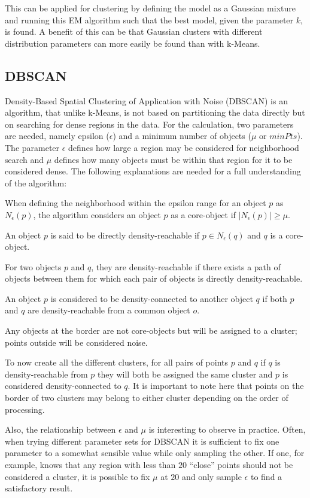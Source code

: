 \documentclass[
	a4paper,
	english,
	twoside,
	openright,               
	11pt                            
	]{report}
\begin{document}
This can be applied for clustering by defining the model as a Gaussian mixture and running this EM algorithm such that the best model, given the parameter $k$, is found. A benefit of this can be that Gaussian clusters with different distribution parameters can more easily be found than with k-Means.

\subsection{DBSCAN}
Density-Based Spatial Clustering of Application with Noise (DBSCAN) \cite{10.5555/3001460.3001507} is an algorithm, that unlike k-Means, is not based on partitioning the data directly but on searching for dense regions in the data. For the calculation, two parameters are needed, namely epsilon ($\epsilon$) and a minimum number of objects ($\mu$ or $minPts$). The parameter $\epsilon$ defines how large a region may be considered for neighborhood search and $\mu$ defines how many objects must be within that region for it to be considered dense. The following explanations are needed for a full understanding of the algorithm:
\newline

When defining the neighborhood within the epsilon range for an object $p$ as $N_\epsilon(p)$, the algorithm considers an object $p$ as a core-object if $|N_\epsilon(p)|\geq \mu$.

An object $p$ is said to be directly density-reachable if $p\in N_\epsilon(q) $ and $q$ is a core-object.

For two objects $p$ and $q$, they are density-reachable if there exists a path of objects between them for which each pair of objects is directly density-reachable.

An object $p$ is considered to be density-connected to another object $q$ if both $p$ and $q$ are density-reachable from a common object $o$.

Any objects at the border are not core-objects but will be assigned to a cluster; points outside will be considered noise.
\newline

To now create all the different clusters, for all pairs of points $p$ and $q$ if $q$ is density-reachable from $p$ they will both be assigned the same cluster and $p$ is considered density-connected to $q$. It is important to note here that points on the border of two clusters may belong to either cluster depending on the order of processing.

Also, the relationship between $\epsilon$ and $\mu$ is interesting to observe in practice. Often, when trying different parameter sets for DBSCAN it is sufficient to fix one parameter to a somewhat sensible value while only sampling the other. If one, for example, knows that any region with less than $20$ ``close'' points should not be considered a cluster, it is possible to fix $\mu$ at $20$ and only sample $\epsilon$ to find a satisfactory result.
\end{document}
